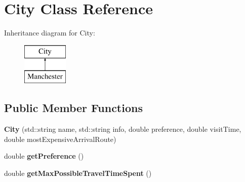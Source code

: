\hypertarget{class_city}{}\section{City Class Reference}
\label{class_city}
Inheritance diagram for City\+:\begin{figure}[H]
\begin{center}
\leavevmode
\includegraphics[height=2.000000cm]{class_city}
\end{center}
\end{figure}
\subsection*{Public Member Functions}
\begin{DoxyCompactItemize}
\item 
\hypertarget{class_city_a08e06bda79e81a069bad67791d993aa3}{}{\bfseries City} (std\+::string name, std\+::string info, double preference, double visit\+Time, double most\+Expensive\+Arrival\+Route)\label{class_city_a08e06bda79e81a069bad67791d993aa3}

\item 
\hypertarget{class_city_aad94270f6763e40fc8e27c5252e7bff3}{}double {\bfseries get\+Preference} ()\label{class_city_aad94270f6763e40fc8e27c5252e7bff3}

\item 
\hypertarget{class_city_a02cffba69dbd396bfa67e98ec5e3ff6f}{}double {\bfseries get\+Max\+Possible\+Travel\+Time\+Spent} ()\label{class_city_a02cffba69dbd396bfa67e98ec5e3ff6f}

\end{DoxyCompactItemize}
